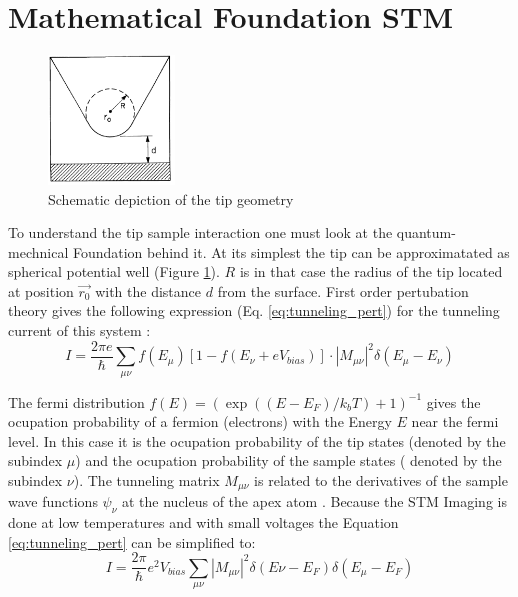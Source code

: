 \section{Mathematical Foundation STM}
\begin{figure}
    \centering
    \includegraphics[width=0.3\textwidth]{graphics/fundamental_tip_sheme.PNG}
    \caption{Schematic depiction of the tip geometry \cite{PhysRevLett}}
    \label{fig:tip_scheme}
\end{figure}
To understand the tip sample interaction one must look at the quantum-mechnical Foundation behind it.
At its simplest the tip can be approximatated as spherical potential well (Figure \ref{fig:tip_scheme}). $R$ is in that case the radius of the tip located at position $\vec{r_0}$ with the distance $d$ from the surface.
First order pertubation theory gives the following expression (Eq. \ref{eq:tunneling_pert}) for the tunneling current of this system \cite{PhysRevLett}:
\begin{equation}
    I = \frac{2 \pi e}{\hbar} \sum_{\mu \nu} f(E_{\mu})[1 - f(E_{\nu}+eV_{bias})]\cdot |M_{\mu \nu}|^2 \delta(E_{\mu}- E_{\nu})
    \label{eq:tunneling_pert}
\end{equation}


The fermi distribution $f(E)= (\exp((E-E_F)/k_b T)+1)^{-1}$ gives the ocupation probability of a fermion (electrons) with the Energy $E$ near the fermi level.
In this case it is the ocupation probability of the tip states (denoted by the subindex $\mu$) and the ocupation probability of the sample states ( denoted by the subindex $\nu$).
The tunneling matrix $M_{\mu \nu}$ is related to the derivatives of the sample wave functions $\psi_{\nu} $ at the nucleus of the apex atom \cite{tunnelmatrix}.
Because the STM Imaging is done at low temperatures and with small voltages the Equation \ref{eq:tunneling_pert} can be simplified to:
\begin{equation}
    I = \frac{2 \pi}{\hbar} e^2 V_{bias} \sum_{\mu \nu}  |M_{\mu \nu}|^2 \delta(E{\nu}-E_F) \delta(E_{\mu}- E_{F})
    \label{eq:tunneling_pert_simple}
\end{equation}

